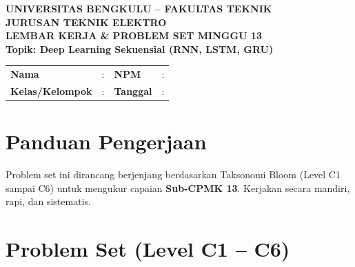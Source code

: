 \documentclass[11pt,a4paper]{article}
\begin{document}
\begin{center}
    {\large \textbf{\color{primaryblue}UNIVERSITAS BENGKULU -- FAKULTAS TEKNIK}}\\[0.1cm]
    {\large \textbf{\color{secondaryblue}JURUSAN TEKNIK ELEKTRO}}\\[0.25cm]
    {\LARGE \textbf{\color{primaryblue}LEMBAR KERJA \& PROBLEM SET MINGGU 13}}\\[0.1cm]
    {\normalsize \textbf{Topik: Deep Learning Sekuensial (RNN, LSTM, GRU)}}
\end{center}

\vspace{0.2cm}

\begin{tcolorbox}[colback=boxbg,colframe=primaryblue,arc=2mm,title=\textbf{Identitas Mahasiswa}]
\small
\begin{tabular}{p{2.5cm}p{5.5cm}p{2.5cm}p{4.5cm}}
\textbf{Nama} & : \dotfill & \textbf{NPM} & : \dotfill \\
\textbf{Kelas/Kelompok} & : \dotfill & \textbf{Tanggal} & : \dotfill \\
\end{tabular}
\end{tcolorbox}

\vspace{0.2cm}

\section{Panduan Pengerjaan}
Problem set ini dirancang berjenjang berdasarkan Taksonomi Bloom (Level C1 sampai C6) untuk mengukur capaian \textbf{Sub-CPMK 13}. Kerjakan secara mandiri, rapi, dan sistematis.

\section{Problem Set (Level C1 -- C6)}
\end{document}

